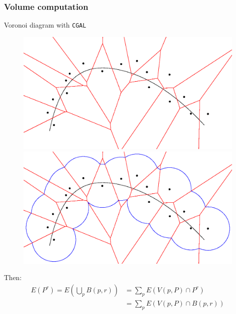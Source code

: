 \documentclass{beamer}
\begin{document}
\begin{frame}
    \frametitle{Volume computation}

    Voronoi diagram with \texttt{CGAL}
    \begin{figure}
        \centering
        \includegraphics[scale=0.28]{img/voronoi-curve-2d}
        \hfill
        \includegraphics[scale=0.28]{img/voronoi-offset-2d}
    \end{figure}

    Then:
    \begin{align*}
        E(P^r) = E \left( \bigcup_p B(p, r) \right) &= \sum_p E(V(p, P) \cap P^r) \\
        &= \sum_p E(V(p, P) \cap B(p, r)) \\
    \end{align*}
\end{frame}
\end{document}

